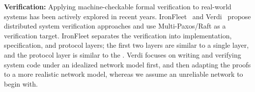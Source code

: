 \textbf{Verification:} Applying machine-checkable formal verification to real-world systems has been actively explored in recent years. IronFleet~\cite{ironfleet} and Verdi~\cite{verdi} propose distributed system verification approaches and use Multi-Paxos/Raft as a verification target. IronFleet separates the verification into implementation, specification, and protocol layers; the first two layers are similar to a single \sysname{} layer, and the protocol layer is similar to the \sysname{} \ghostlayer{}. Verdi focuses on writing and verifying system code under an idealized network model first, and then adapting the proofs to a more realistic network model, whereas we assume an unreliable network to begin with. 


